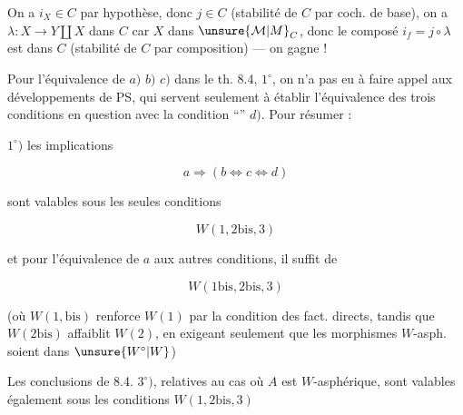 
On a $i_X\in C$ par hypothèse, donc $j\in C$ (stabilité de $C$ par coch. de base), on a $\lambda:X\longrightarrow Y\amalg X$ dans $C$ car $X$ dans $\unsure{\mathcal{M}|M}_C$, donc le composé $i_f=j\circ\lambda$ est dans $C$ (stabilité de $C$ par composition) --- on gagne !


Pour l'équivalence de $a)$ $b)$ $c)$ dans le th. 8.4, $1^\circ$, on n'a  pas eu à faire appel aux  développements de PS, qui servent  seulement à établir l'équivalence des trois conditions en question avec la condition ``'' $d)$. Pour résumer :

$1^\circ)$ les implications

\[
a\Rightarrow(b\Leftrightarrow c\Leftrightarrow d)
\]

sont valables sous les seules conditions

\[
W(1,2\mathrm{bis},3)
\]

et  pour l'équivalence de $a$ aux autres conditions, il suffit de

\[
W(1\mathrm{bis},2\mathrm{bis},3)
\]

(où $W(1,\mathrm{bis})$ renforce $W(1)$ par la condition des fact. directs, tandis que $W(2\mathrm{bis})$ affaiblit $W(2)$, en exigeant seulement que les morphismes $W$-asph. soient dans $\unsure{W^{\circ}|W}$)

 Les conclusions de 8.4. $3^\circ)$, relatives au cas où $A$ est $W$-asphérique, sont valables également sous les conditions $W(1,2\mathrm{bis},3)$
